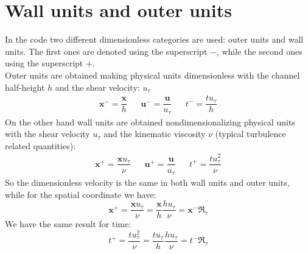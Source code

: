 \chapter{Wall units and outer units}
In the code two different dimensionless categories are used: outer units and wall units. The first ones are denoted using the superscript $-$, while the second ones using the superscript $+$. \\
Outer units are obtained making physical units dimensionless with the channel half-height $h$ and the shear velocity: $u_\tau$
\[
\begin{array}{ccccc}
\mathbf{x}^-=\dfrac{\mathbf{x}}{h} && \mathbf{u}^-=\dfrac{\mathbf{u}}{u_\tau} & &t^-=\dfrac{tu_\tau}{h}
\end{array}
\]
On the other hand wall units are obtained nondimensionalizing physical units with the shear velocity $u_\tau$ and the kinematic viscosity $\nu$ (typical turbulence related quantities):
\[
\begin{array}{ccccc}
\mathbf{x}^+=\dfrac{\mathbf{x}u_\tau}{\nu} && \mathbf{u}^+=\dfrac{\mathbf{u}}{u_\tau} & &t^+=\dfrac{tu_\tau^2}{\nu}
\end{array}
\]
So the dimensionless velocity is the same in both wall units and outer units, while for the spatial coordinate we have:
\[
\mathbf{x}^+=\frac{\mathbf{x}u_\tau}{\nu}=\frac{\mathbf{x}}{h}\frac{hu_\tau}{\nu}=\mathbf{x}^- \Re_\tau
\]
We have the same result for time:
\[
t^+=\frac{tu_\tau^2}{\nu}=\frac{tu_\tau}{h}\frac{hu_\tau}{\nu}=t^-\Re_\tau
\]
